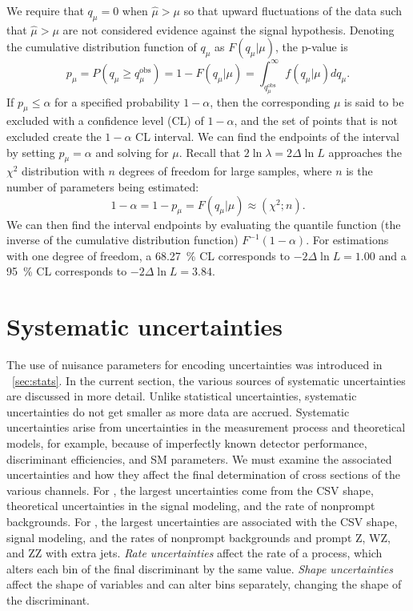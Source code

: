 We require that $q_\mu=0$ when $\hat{\mu} > \mu$ so that upward fluctuations of
the data such that $\hat{\mu} > \mu$ are not considered evidence against the
signal hypothesis. Denoting the cumulative distribution function of $q_\mu$ as
$F(q_\mu|\mu)$, the p-value is
\begin{equation}
  p_\mu = P(q_\mu \geq q_\mu^\text{obs}) = 1 - F(q_\mu|\mu) =
  \int_{q_\mu^\text{obs}}^\infty f(q_\mu|\mu) dq_\mu.
  \label{equation:pmu}
\end{equation}
If $p_\mu \leq \alpha$ for a specified probability $1 - \alpha$, then the
corresponding $\mu$ is said to be excluded with a confidence level (CL) of
$1-\alpha$, and the set of points that is not excluded create the $1 - \alpha$ CL
interval. We can find the endpoints of the interval by setting $p_\mu=\alpha$
and solving for $\mu$. Recall that $2 \ln \lambda = 2 \Delta \ln L$ approaches
the $\chi^2$ distribution with $n$ degrees of freedom for large samples, where
$n$ is the number of parameters being estimated:
\begin{equation}
  1 - \alpha = 1 - p_\mu = F(q_\mu|\mu) \approx (\chi^2;n).
  \label{eq:cl}
\end{equation}
We can then find the interval endpoints by evaluating the quantile function
(the inverse of the cumulative distribution function) $F^{-1}(1 - \alpha)$. For
estimations with one degree of freedom, a \SI{68.27}{\percent} CL corresponds to
$-2\Delta \ln L = 1.00$ and a \SI{95}{\percent} CL corresponds to $-2\Delta \ln
L = 3.84$.
%
\section{Systematic uncertainties}
\label{sec:8-systematics}
The use of nuisance parameters for encoding uncertainties was introduced in
~\cref{sec:stats}. In the current section, the various sources of systematic
uncertainties are discussed in more detail. Unlike statistical
uncertainties, systematic uncertainties do not get smaller as more data are
accrued. Systematic uncertainties arise from uncertainties in the measurement
process and theoretical models, for example, because of imperfectly known detector
performance, discriminant efficiencies, and SM parameters. We must examine the
associated uncertainties and how they affect the final determination of cross
sections of the various channels. For \ttW, the largest uncertainties come from
the CSV shape, theoretical uncertainties in the signal modeling, and the rate of
nonprompt backgrounds. For \ttZ, the largest uncertainties are associated with
the CSV shape, signal modeling, and the rates of nonprompt backgrounds and
prompt Z, WZ, and ZZ with extra jets. \emph{Rate uncertainties} affect the rate
of a process, which alters each bin of the final discriminant by the same value.
\emph{Shape uncertainties} affect the shape of variables and can alter bins
separately, changing the shape of the discriminant.

